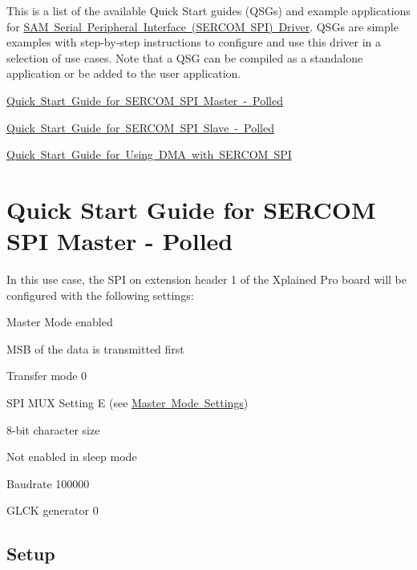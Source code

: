 This is a list of the available Quick Start guides (Q\+S\+Gs) and example applications for \mbox{\hyperlink{group__asfdoc__sam0__sercom__spi__group}{S\+AM Serial Peripheral Interface (S\+E\+R\+C\+OM S\+PI) Driver}}. Q\+S\+Gs are simple examples with step-\/by-\/step instructions to configure and use this driver in a selection of use cases. Note that a Q\+SG can be compiled as a standalone application or be added to the user application.


\begin{DoxyItemize}
\item \mbox{\hyperlink{asfdoc_sam0_sercom_spi_master_basic_use}{Quick Start Guide for S\+E\+R\+C\+OM S\+PI Master -\/ Polled}}
\item \mbox{\hyperlink{asfdoc_sam0_sercom_spi_slave_basic_use}{Quick Start Guide for S\+E\+R\+C\+OM S\+PI Slave -\/ Polled}}
\item \mbox{\hyperlink{asfdoc_sam0_sercom_spi_dma_use_case}{Quick Start Guide for Using D\+MA with S\+E\+R\+C\+OM S\+PI}} 
\end{DoxyItemize}\hypertarget{asfdoc_sam0_sercom_spi_master_basic_use}{}\section{Quick Start Guide for S\+E\+R\+C\+OM S\+PI Master -\/ Polled}\label{asfdoc_sam0_sercom_spi_master_basic_use}
In this use case, the S\+PI on extension header 1 of the Xplained Pro board will be configured with the following settings\+:
\begin{DoxyItemize}
\item Master Mode enabled
\item M\+SB of the data is transmitted first
\item Transfer mode 0
\item S\+PI M\+UX Setting E (see \mbox{\hyperlink{asfdoc_sam0_sercom_spi_mux_settings_asfdoc_sam0_sercom_spi_mux_settings_master}{Master Mode Settings}})
\item 8-\/bit character size
\item Not enabled in sleep mode
\item Baudrate 100000
\item G\+L\+CK generator 0
\end{DoxyItemize}\hypertarget{asfdoc_sam0_sercom_spi_master_basic_use_asfdoc_sam0_sercom_spi_master_basic_use_setup}{}\subsection{Setup}\label{asfdoc_sam0_sercom_spi_master_basic_use_asfdoc_sam0_sercom_spi_master_basic_use_setup}
